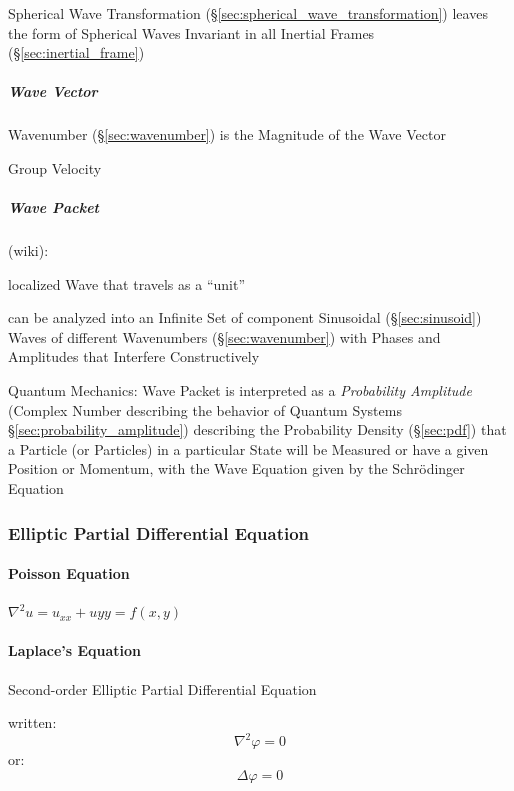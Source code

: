 {Spherical Wave Transformation (\S\ref{sec:spherical_wave_transformation})
leaves the form of Spherical Waves Invariant in all Inertial Frames
(\S\ref{sec:inertial_frame})



\subparagraph{Wave Vector}\label{sec:wave_vector}\hfill

Wavenumber (\S\ref{sec:wavenumber}) is the Magnitude of the Wave Vector

Group Velocity



\subparagraph{Wave Packet}\label{sec:wave_packet}\hfill

(wiki):

localized Wave that travels as a ``unit''

can be analyzed into an Infinite Set of component Sinusoidal
(\S\ref{sec:sinusoid}) Waves of different Wavenumbers (\S\ref{sec:wavenumber})
with Phases and Amplitudes that Interfere Constructively

Quantum Mechanics: Wave Packet is interpreted as a \emph{Probability Amplitude}
(Complex Number describing the behavior of Quantum Systems
\S\ref{sec:probability_amplitude}) describing the Probability Density
(\S\ref{sec:pdf}) that a Particle (or Particles) in a particular State will be
Measured or have a given Position or Momentum, with the Wave Equation given by
the Schr\"odinger Equation



\subsubsection{Elliptic Partial Differential Equation}
\label{sec:elliptic_partial_differential}

\paragraph{Poisson Equation}\label{sec:poisson_equation}\hfill

$\nabla^2 u = u_{xx} + u{yy} = f(x,y)$



\paragraph{Laplace's Equation}\label{sec:laplaces_equation}\hfill

Second-order Elliptic Partial Differential Equation

written:
\[ \nabla^2 \varphi = 0 \]
or:
\[ \Delta \varphi = 0 \]

}
